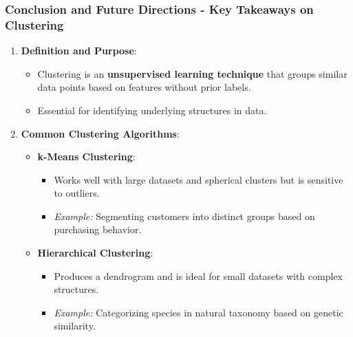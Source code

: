 \documentclass[aspectratio=169]{beamer}
\begin{document}
\begin{frame}[fragile]
    \frametitle{Conclusion and Future Directions - Key Takeaways on Clustering}
    \begin{enumerate}
        \item \textbf{Definition and Purpose}:
        \begin{itemize}
            \item Clustering is an \textbf{unsupervised learning technique} that groups similar data points based on features without prior labels.
            \item Essential for identifying underlying structures in data.
        \end{itemize}
        
        \item \textbf{Common Clustering Algorithms}:
        \begin{itemize}
            \item \textbf{k-Means Clustering}:
            \begin{itemize}
                \item Works well with large datasets and spherical clusters but is sensitive to outliers.
                \item \textit{Example:} Segmenting customers into distinct groups based on purchasing behavior.
            \end{itemize}
            \item \textbf{Hierarchical Clustering}:
            \begin{itemize}
                \item Produces a dendrogram and is ideal for small datasets with complex structures.
                \item \textit{Example:} Categorizing species in natural taxonomy based on genetic similarity.
            \end{itemize}
        \end{itemize}
    \end{enumerate}
\end{frame}
\end{document}
